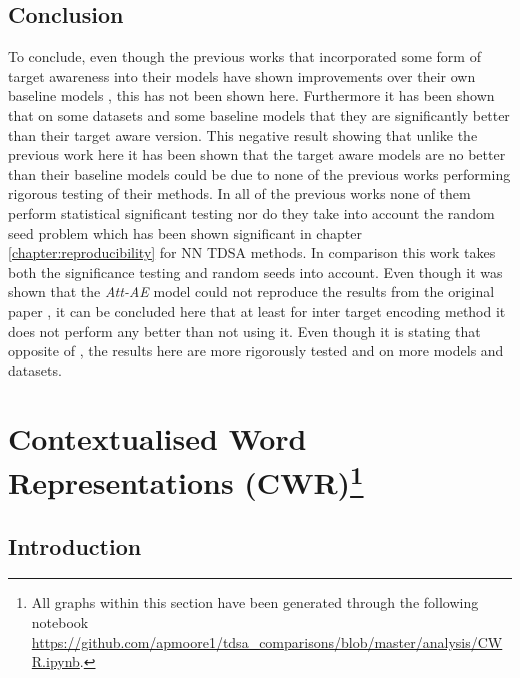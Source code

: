 \subsection{Conclusion}
To conclude, even though the previous works that incorporated some form of target awareness into their models have shown improvements over their own baseline models \citep{zhao2019modeling, fan-etal-2018-multi}, this has not been shown here. Furthermore it has been shown that on some datasets and some baseline models that they are significantly better than their target aware version. This negative result showing that unlike the previous work here it has been shown that the target aware models are no better than their baseline models could be due to none of the previous works performing rigorous testing of their methods. In all of the previous works none of them perform statistical significant testing nor do they take into account the random seed problem \citep{reimers-gurevych-2017-reporting} which has been shown significant in chapter \ref{chapter:reproducibility} for NN TDSA methods. In comparison this work takes both the significance testing and random seeds into account. Even though it was shown that the \textit{Att-AE} model could not reproduce the results from the original paper \citep{hazarika-etal-2018-modeling}, it can be concluded here that at least for \citet{hazarika-etal-2018-modeling} inter target encoding method it does not perform any better than not using it. Even though it is stating that opposite of  \citet{hazarika-etal-2018-modeling}, the results here are more rigorously tested and on more models and datasets.

\section[Contextualised Word Representations (CWR)]{Contextualised Word Representations (CWR)\footnote{All graphs within this section have been generated through the following notebook \url{https://github.com/apmoore1/tdsa_comparisons/blob/master/analysis/CWR.ipynb}.}}
\label{section:aug_cwr}
\subsection{Introduction}
\label{section:aug_cwr_intro}

